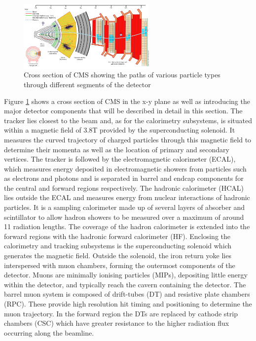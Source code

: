 \begin{figure}
\centering
    \includegraphics[width=0.6\textwidth]{./Figures/detector/CMS_Slice.jpg}
  \caption{Cross section of CMS showing the paths of various particle types 
  through different segments of the detector~\cite{cmsslice}}
  \label{CMS_SLICE}
\end{figure}

Figure \ref{CMS_SLICE} shows a cross section of CMS in the x-y plane as well as introducing the major detector components that will be described 
in detail in this section. The tracker lies closest to the beam and, as for the calorimetry subsystems, is situated within a magnetic field of 3.8T provided
by the superconducting solenoid. It measures the curved trajectory of charged particles through this magnetic field to determine their momenta 
as well as the location of primary and secondary vertices. The tracker is followed by the electromagnetic calorimeter (ECAL),
which measures energy deposited in electromagnetic showers from particles such as electrons and photons and is separated in barrel and endcap 
components for the central and forward regions respectively. The hadronic calorimeter (HCAL) lies outside the 
ECAL and measures energy from nuclear interactions of hadronic particles. It is a sampling calorimeter
made up of several layers of absorber and scintillator to allow hadron showers to be measured over a maximum of around 11 radiation lengths. 
The coverage of the hadron calorimeter is extended into the forward regions with the hadronic forward calorimeter (HF). Enclosing the calorimetry and tracking subsystems 
is the superconducting solenoid which generates the magnetic field. Outside the solenoid, the iron return yoke lies interspersed with muon chambers, forming the outermost components of the detector. 
Muons are minimally ionising particles (MIPs), depositing little energy within the detector, and typically reach the cavern containing the detector. 
The barrel muon system is composed of drift-tubes (DT) and resistive plate chambers (RPC). These provide
high resolution hit timing and positioning to determine the muon trajectory. In the forward region the DTs are 
replaced by cathode strip chambers (CSC) which have greater resistance to the higher 
radiation flux occurring along the beamline. 

